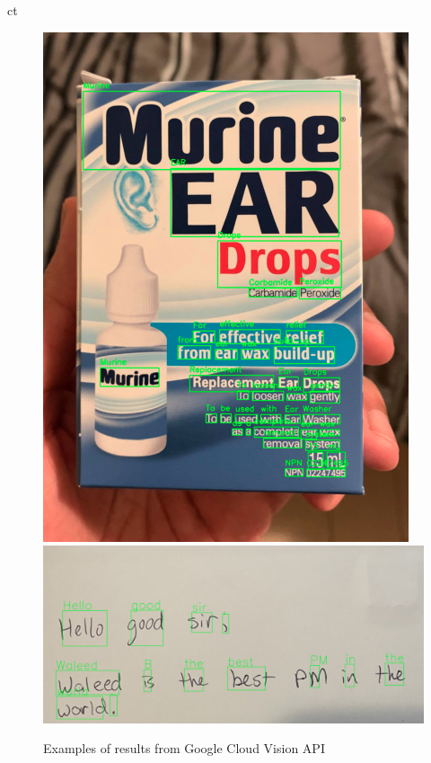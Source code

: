 ct\documentclass[a4paper,11pt]{article}
\begin{document}
\begin{figure}[H]
\centering
\includegraphics[scale=0.5]{img/cv/ocr/ocr_text_in_the_wild.png}
\includegraphics[scale=0.5]{img/cv/ocr/ocr_handwriting.png}
\caption{Examples of results from Google Cloud Vision API}
\label{fig:google_vision_examples}
\end{figure}
\end{document}
